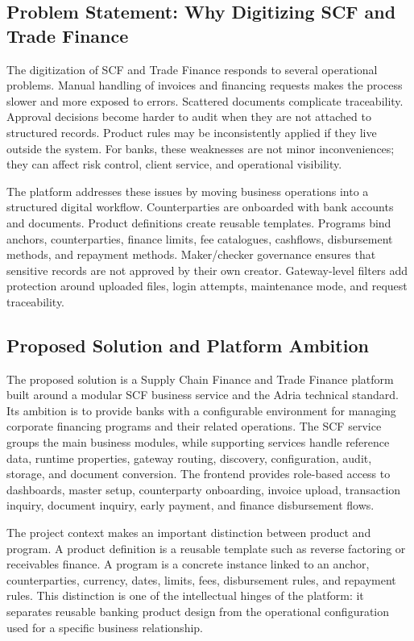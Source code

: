 \subsection{Problem Statement: Why Digitizing SCF and Trade Finance}
\label{subsec:problem_statement}

The digitization of SCF and Trade Finance responds to several operational problems. Manual handling of invoices and financing requests makes the process slower and more exposed to errors. Scattered documents complicate traceability. Approval decisions become harder to audit when they are not attached to structured records. Product rules may be inconsistently applied if they live outside the system. For banks, these weaknesses are not minor inconveniences; they can affect risk control, client service, and operational visibility.

The platform addresses these issues by moving business operations into a structured digital workflow. Counterparties are onboarded with bank accounts and documents. Product definitions create reusable templates. Programs bind anchors, counterparties, finance limits, fee catalogues, cashflows, disbursement methods, and repayment methods. Maker/checker governance ensures that sensitive records are not approved by their own creator. Gateway-level filters add protection around uploaded files, login attempts, maintenance mode, and request traceability.

\subsection{Proposed Solution and Platform Ambition}
\label{subsec:proposed_solution}

The proposed solution is a Supply Chain Finance and Trade Finance platform built around a modular SCF business service and the Adria technical standard. Its ambition is to provide banks with a configurable environment for managing corporate financing programs and their related operations. The SCF service groups the main business modules, while supporting services handle reference data, runtime properties, gateway routing, discovery, configuration, audit, storage, and document conversion. The frontend provides role-based access to dashboards, master setup, counterparty onboarding, invoice upload, transaction inquiry, document inquiry, early payment, and finance disbursement flows.

The project context makes an important distinction between product and program. A product definition is a reusable template such as reverse factoring or receivables finance. A program is a concrete instance linked to an anchor, counterparties, currency, dates, limits, fees, disbursement rules, and repayment rules. This distinction is one of the intellectual hinges of the platform: it separates reusable banking product design from the operational configuration used for a specific business relationship.

